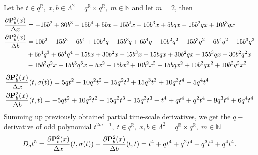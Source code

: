 \begin{examp}
    Let be $t\in q^{\mathbb{R}}, \; x,b\in \Lambda^2 = q^{\mathbb{R}} \times q^{\mathbb{R}}, \; m\in\mathbb{N}$ and let $m=2$, then
    \begin{align*}
        \frac{\partial {\mathbf{P}}\sp{2} \sb{b}(x)}{\Delta x}
        &= -15 b^2 + 30 b^3 - 15 b^4 + 5 b x - 15 b^2 x + 10 b^3 x + 5 b q x - 15 b^2 q x + 10 b^3 q x \\
        \frac{\partial {\mathbf{P}}\sp{2} \sb{b}(x)}{\Delta b}
        &= 10 b^2 - 15 b^3 + 6 b^4 + 10 b^2 q - 15 b^3 q + 6 b^4 q
        + 10 b^2 q^2 - 15 b^3 q^2 + 6 b^4 q^2 - 15 b^3 q^3 \\
        &+ 6 b^4 q^3 + 6 b^4 q^4 - 15 b x + 30 b^2 x - 15 b^3 x - 15 b q x + 30 b^2 q x
        - 15 b^3 q x + 30 b^2 q^2 x \\
        &- 15 b^3 q^2 x - 15 b^3 q^3 x + 5 x^2 - 15 b x^2 + 10 b^2 x^2 - 15 b q x^2 + 10 b^2 q x^2 + 10 b^2 q^2 x^2
    \end{align*}
    \begin{align*}
        &\frac{\partial {\mathbf{P}}\sp{2} \sb{b}(x)}{\Delta x}(t, \sigma(t))
        = 5 q t^2 - 10 q^2 t^2 - 15 q^2 t^3 + 15 q^3 t^3 + 10 q^3 t^4 - 5 q^4 t^4 \\
        &\frac{\partial {\mathbf{P}}\sp{2} \sb{b}(x)}{\Delta b}(t, t)
        = -5 q t^2 + 10 q^2 t^2 + 15 q^2 t^3 - 15 q^3 t^3 + t^4 + q t^4 + q^2 t^4 - 9 q^3 t^4 + 6 q^4 t^4
    \end{align*}
    Summing up previously obtained partial time-scale derivatives, we get the $q-$derivative of odd polynomial
    $t^{2m+1}, \; t\in q^{\mathbb{R}}, \; x,b\in \Lambda^2 = q^{\mathbb{R}} \times q^{\mathbb{R}}, \; m\in\mathbb{N}$
    \[
        D_{q} t^{5}
        = \frac{\partial {\mathbf{P}}\sp{2} \sb{b}(x)}{\Delta x}(t, \sigma(t)) + \frac{\partial {\mathbf{P}}\sp{2} \sb{b}(x)}{\Delta b}(t, t)
        = t^4 + q t^4 + q^2 t^4 + q^3 t^4 + q^4 t^4.
    \]
\end{examp}